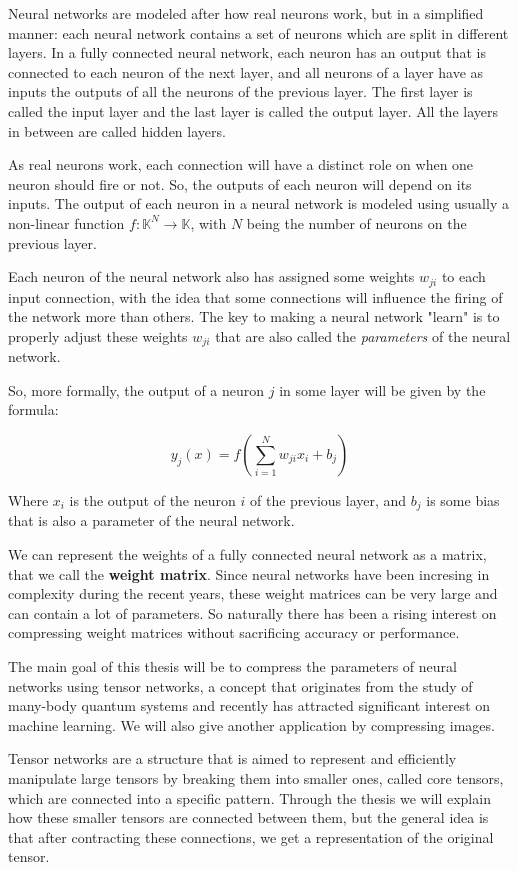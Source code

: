 \documentclass[11pt,a4paper,openright,oneside]{book}
\numberwithin{equation}{section}
\begin{document}
Neural networks are modeled after how real neurons work, but in a simplified manner: each neural network contains a set of neurons which are split in
different layers. In a fully connected neural network, each neuron has an output that is connected to each neuron of the next layer, and all neurons of a layer
have as inputs the outputs of all the neurons of the previous layer. The first layer is called the input layer and the last layer is called the output layer.
All the layers in between are called hidden layers.

As real neurons work, each connection will have a distinct role on when one neuron should fire or not. So, the outputs of each neuron will depend on its inputs. The output of each neuron in
a neural network is modeled using usually a non-linear function $f : \mathbb{K}^N \rightarrow \mathbb{K}$,
with $N$ being the number of neurons on the previous layer.

Each neuron of the neural network also has assigned some weights $w_{ji}$ to each input connection, with the idea that
some connections will influence the firing of the network more than others. The key to making a neural network "learn" is
to properly adjust these weights $w_{ji}$ that are also called the \textit{parameters} of the neural network.

So, more formally, the output of a neuron $j$ in some layer will be given by the formula:

$$ y_j(x) = f\left(\sum_{i=1}^N w_{ji} x_i + b_{j}\right) $$ 

Where $x_{i}$ is the output of the neuron $i$ of the previous layer, and $b_j$ is some bias that is also a parameter of the neural network.

We can represent the weights of a fully connected neural network as a matrix, that we call the \textbf{weight matrix}.
Since neural networks have been incresing in complexity during the recent years, these weight matrices can be very large
and can contain a lot of parameters. So naturally there has been a rising interest on compressing weight matrices without sacrificing accuracy or performance.

The main goal of this thesis will be to compress the parameters of neural networks using tensor networks, a concept 
that originates from the study of many-body quantum systems \cite{orusTensorNetworksComplex2019}
and recently has attracted significant interest on machine learning. We will also give another application
by compressing images.

Tensor networks are a structure that is aimed to represent and efficiently manipulate large tensors by breaking them into
smaller ones, called core tensors, which are connected into a specific pattern. Through the thesis we will explain how
these smaller tensors are connected between them, but the general idea is that after contracting these connections,
we get a representation of the original tensor.
\end{document}
